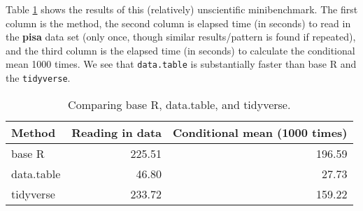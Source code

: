\documentclass[]{book}
\newenvironment{Shaded}{\begin{snugshade}}{\end{snugshade}}
\newcommand{\CommentTok}[1]{\textcolor[rgb]{0.56,0.35,0.01}{\textit{#1}}}
\newcommand{\DataTypeTok}[1]{\textcolor[rgb]{0.13,0.29,0.53}{#1}}
\newcommand{\DecValTok}[1]{\textcolor[rgb]{0.00,0.00,0.81}{#1}}
\newcommand{\KeywordTok}[1]{\textcolor[rgb]{0.13,0.29,0.53}{\textbf{#1}}}
\newcommand{\NormalTok}[1]{#1}
\newcommand{\OperatorTok}[1]{\textcolor[rgb]{0.81,0.36,0.00}{\textbf{#1}}}
\newcommand{\OtherTok}[1]{\textcolor[rgb]{0.56,0.35,0.01}{#1}}
\newcommand{\StringTok}[1]{\textcolor[rgb]{0.31,0.60,0.02}{#1}}
\begin{document}
\begin{Shaded}
\end{Shaded}

Table \ref{tab:benchresults} shows the results of this (relatively) unscientific minibenchmark. The first column is the method, the second column is elapsed time (in seconds) to read in the \textbf{pisa} data set (only once, though similar results/pattern is found if repeated), and the third column is the elapsed time (in seconds) to calculate the conditional mean 1000 times. We see that \texttt{data.table} is substantially faster than base R and the \texttt{tidyverse}.

\begin{table}

\caption{\label{tab:benchresults}Comparing base R, data.table, and tidyverse.}
\centering
\begin{tabular}[t]{l|r|r}
\hline
Method & Reading in data & Conditional mean (1000 times)\\
\hline
base R & 225.51 & 196.59\\
\hline
data.table & 46.80 & 27.73\\
\hline
tidyverse & 233.72 & 159.22\\
\hline
\end{tabular}
\end{table}
\end{document}
